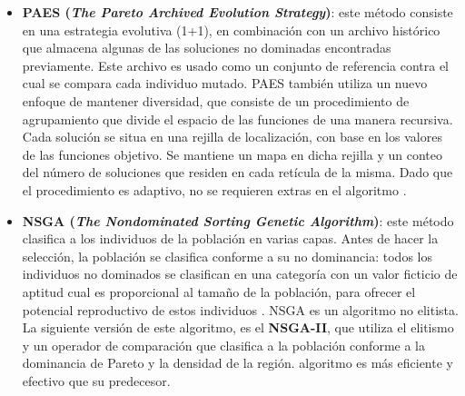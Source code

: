 \begin{itemize}
   \begin{itemize}
    \item \textbf{PAES (\textit{The Pareto Archived Evolution Strategy})}: este m\'etodo consiste en una estrategia evolutiva (1+1),
    en combinaci\'on con un archivo hist\'orico que almacena algunas de las soluciones no dominadas encontradas previamente. Este
    archivo es usado como un conjunto de referencia contra el cual se compara cada individuo mutado. PAES tambi\'en utiliza un nuevo 
    enfoque de mantener diversidad, que consiste de un procedimiento de agrupamiento que divide el espacio de las funciones \DIFdelbegin {}\DIFdelend \DIFaddbegin {}\DIFaddend de una manera recursiva. Cada soluci\'on se situa en una rejilla de localizaci\'on, con base en los valores de las funciones
    objetivo. Se mantiene un mapa en dicha rejilla y un conteo del n\'umero de soluciones que residen en cada ret\'icula de la misma.
    Dado que el procedimiento es adaptivo, no se requieren \DIFdelbegin {}\DIFdelend \DIFaddbegin {}\DIFaddend extras en el algoritmo \cite{paes99}.

    \item \textbf{NSGA (\textit{The Nondominated Sorting Genetic Algorithm})}: este m\'etodo clasifica a los 
    individuos de la poblaci\'on en varias capas. Antes de hacer la selecci\'on, la poblaci\'on se clasifica conforme a 
    su no dominancia: todos los individuos no dominados se clasifican en una categor\'ia con un valor ficticio de 
    aptitud \DIFdelbegin {}\DIFdelend \DIFaddbegin {}\DIFaddend cual es proporcional al tama\~no de la poblaci\'on, para ofrecer el potencial reproductivo de estos 
    individuos \cite{Srinivas94}. NSGA es un algoritmo no elitista. La siguiente versi\'on de este algoritmo, es el \textbf{NSGA-II}, 
    que utiliza el elitismo y un operador de comparaci\'on que clasifica a la poblaci\'on conforme a la dominancia de Pareto y 
    la densidad de la regi\'on. \DIFdelbegin {}\DIFdelend \DIFaddbegin {}\DIFaddend algoritmo es m\'as eficiente y efectivo que su predecesor.


\end{itemize}
\end{itemize}
